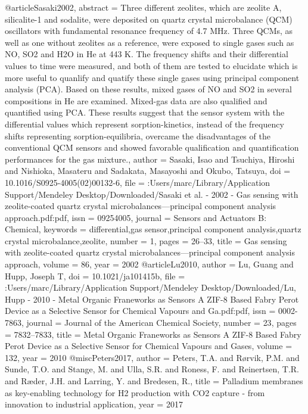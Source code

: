 @article{Sasaki2002,
abstract = {Three different zeolites, which are zeolite A, silicalite-1 and sodalite, were deposited on quartz crystal microbalance (QCM) oscillators with fundamental resonance frequency of 4.7 MHz. Three QCMs, as well as one without zeolites as a reference, were exposed to single gases such as NO, SO2 and H2O in He at 443 K. The frequency shifts and their differential values to time were measured, and both of them are tested to elucidate which is more useful to quanlify and quatify these single gases using principal component analysis (PCA). Based on these results, mixed gases of NO and SO2 in several compositions in He are examined. Mixed-gas data are also qualified and quantified using PCA. These results suggest that the sensor system with the differential values which represent sorption-kinetics, instead of the frequency shifts representing sorption-equilibria, overcame the disadvantages of the conventional QCM sensors and showed favorable qualification and quantification performances for the gas mixture.},
author = {Sasaki, Isao and Tsuchiya, Hiroshi and Nishioka, Masateru and Sadakata, Masayoshi and Okubo, Tatsuya},
doi = {10.1016/S0925-4005(02)00132-6},
file = {:Users/marc/Library/Application Support/Mendeley Desktop/Downloaded/Sasaki et al. - 2002 - Gas sensing with zeolite-coated quartz crystal microbalances—principal component analysis approach.pdf:pdf},
issn = {09254005},
journal = {Sensors and Actuators B: Chemical},
keywords = {differential,gas sensor,principal component analysis,quartz crystal microbalance,zeolite},
number = {1},
pages = {26--33},
title = {{Gas sensing with zeolite-coated quartz crystal microbalances—principal component analysis approach}},
volume = {86},
year = {2002}
}
@article{Lu2010,
author = {Lu, Guang and Hupp, Joseph T},
doi = {10.1021/ja101415b},
file = {:Users/marc/Library/Application Support/Mendeley Desktop/Downloaded/Lu, Hupp - 2010 - Metal Organic Franeworks as Sensors A ZIF-8 Based Fabry Perot Device as a Selective Sensor for Chemical Vapours and Ga.pdf:pdf},
issn = {0002-7863},
journal = {Journal of the American Chemical Society},
number = {23},
pages = {7832--7833},
title = {{Metal Organic Franeworks as Sensors A ZIF-8 Based Fabry Perot Device as a Selective Sensor for Chemical Vapours and Gases}},
volume = {132},
year = {2010}
}
@misc{Peters2017,
author = {Peters, T.A. and R{\o}rvik, P.M. and Sunde, T.O. and Stange, M. and Ulla, S.R. and Roness, F. and Reinertsen, T.R. and R{\ae}der, J.H. and Larring, Y. and Bredesen, R.},
title = {{Palladium membranes as key-enabling technology for H2 production with CO2 capture - from innovation to industrial application}},
year = {2017}
}
